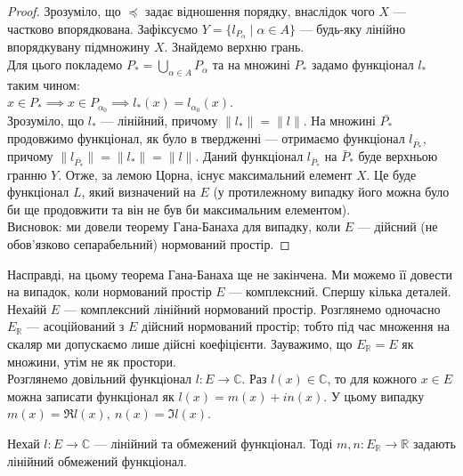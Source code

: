 \documentclass{math_library}
\begin{document}
\begin{proof}
Зрозуміло, що $\preceq$ задає відношення порядку, внаслідок чого $X$ --- частково впорядкована. Зафіксуємо $Y = \{l_{P_\alpha} \mid \alpha \in A\}$ --- будь-яку лінійно впорядкувану підмножину $X$. Знайдемо верхню грань.\\
Для цього покладемо $P_* = \displaystyle\bigcup_{\alpha \in A} P_\alpha$ та на множині $P_*$ задамо функціонал $l_*$ таким чином:\\
$x \in P_* \implies x \in P_{\alpha_0} \implies l_*(x) = l_{\alpha_0}(x)$.\\
Зрозуміло, що $l_*$ --- лінійний, причому $\|l_*\| = \|l\|$. На множині $\bar{P_*}$ продовжимо функціонал, як було в твердженні --- отримаємо функціонал $l_{\bar{P_*}}$, причому $\|l_{\bar{P_*}}\| = \|l_*\| = \|l\|$. Даний функціонал $l_{\bar{P}_*}$ на $\bar{P}_*$ буде верхньою гранню $Y$. Отже, за лемою Цорна, існує максимальний елемент $X$. Це буде функціонал $L$, який визначений на $E$ (у протилежному випадку його можна було би ще продовжити та він не був би максимальним елементом).\\
Висновок: ми довели теорему Гана-Банаха для випадку, коли $E$ --- дійсний (не обов'язково сепарабельний) нормований простір.
\end{proof}
\noindent
Насправді, на цьому теорема Гана-Банаха ще не закінчена. Ми можемо її довести на випадок, коли нормований простір $E$ --- комплексний. Спершу кілька деталей.\\
Нехайй $E$ --- комплексний лінійний нормований простір. Розглянемо одночасно $E_{\mathbb{R}}$ --- асоційований з $E$ дійсний нормований простір; тобто під час множення на скаляр ми допускаємо лише дійсні коефіцієнти. Зауважимо, що $E_{\mathbb{R}} = E$ як множини, утім не як простори.\\
Розглянемо довільний функціонал $l \colon E \to \mathbb{C}$. Раз $l(x) \in \mathbb{C}$, то для кожного $x \in E$ можна записати функціонал як $l(x) = m(x) + i n(x)$. У цьому випадку $m(x) = \Re l(x),\ n(x) = \Im l(x)$.

\begin{proposition}
Нехай $l \colon E \to \mathbb{C}$ --- лінійний та обмежений функціонал. Тоді $m,n \colon E_{\mathbb{R}} \to \mathbb{R}$ задають лінійний обмежений функціонал.
\end{proposition}
\end{document}
